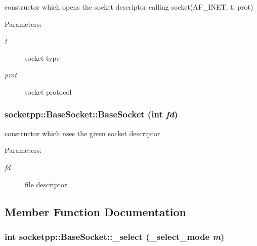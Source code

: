 \begin{CompactItemize}
constructor which opens the socket descriptor calling socket(AF\_\-INET, t, prot) 

\begin{Desc}
\item[Parameters:]
\begin{description}
\item[{\em t}]socket type \item[{\em prot}]socket protocol \end{description}
\end{Desc}
\hypertarget{classsocketpp_1_1BaseSocket_f7e18d6700868abb2b476e797506eafb}{
\subsubsection[{BaseSocket}]{\setlength{\rightskip}{0pt plus 5cm}socketpp::BaseSocket::BaseSocket (int {\em fd})}}
\label{classsocketpp_1_1BaseSocket_f7e18d6700868abb2b476e797506eafb}


constructor which uses the given socket descriptor 

\begin{Desc}
\item[Parameters:]
\begin{description}
\item[{\em fd}]file descriptor \end{description}
\end{Desc}


\subsection{Member Function Documentation}
\hypertarget{classsocketpp_1_1BaseSocket_9c925091102c9371be9990fedd605f1c}{
\subsubsection[{\_\-select}]{\setlength{\rightskip}{0pt plus 5cm}int socketpp::BaseSocket::\_\-select ({\bf \_\-select\_\-mode} {\em m})}}
\label{classsocketpp_1_1BaseSocket_9c925091102c9371be9990fedd605f1c}



\end{CompactItemize}
